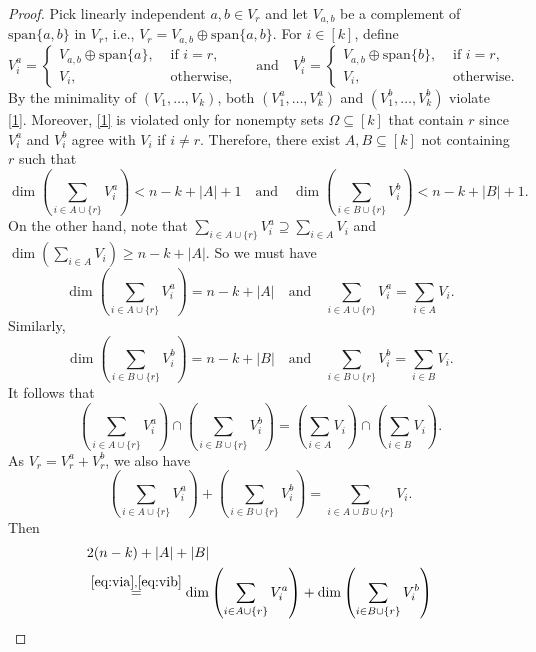 \documentclass[11pt]{article}
\theoremstyle{plain}
\theoremstyle{definition}
\theoremstyle{remark}
\begin{document}
\begin{proof}
Pick linearly independent $a,b\in V_r$ and let $V_{a,b}$ be a complement of $\mathrm{span}\{a,b\}$ in $V_r$, i.e., $V_r=V_{a,b}\oplus\mathrm{span}\{a,b\}$.
For $i\in [k]$, define
\[
V_i^a= \begin{cases} V_{a,b}\oplus \mathrm{span}\{a\}, & \text { if } i=r, \\ V_i, & \text { otherwise, }\end{cases}
\quad\text{and}\quad
V_i^b= \begin{cases}V_{a,b}\oplus \mathrm{span}\{b\}, & \text { if } i=r, \\ V_i, & \text { otherwise. }\end{cases}
\]
By the minimality of $(V_1,\dots,V_k)$, both $(V_1^a,\dots,V_k^a)$ and $(V_1^b,\dots,V_k^b)$ violate \eqref{1}. 
Moreover, \eqref{1} is violated only for nonempty sets $\Omega\subseteq [k]$ that contain $r$ since $V_i^a$ and $V_i^b$ agree with $V_i$ if $i\neq r$. 
Therefore, there exist $A, B\subseteq[k]$ not containing $r$ such that
\[
\dim\left(\sum_{i\in A\cup\{r\}} V_i^a \right)<n-k+|A|+1\quad\text{and}\quad\dim\left(\sum_{i\in B\cup\{r\}} V_i^b\right)<n-k+|B|+1.
\]
On the other hand, note that $\sum_{i\in A\cup\{r\}}V_i^a\supseteq \sum_{i\in A }V_i$ and $\dim(\sum_{i\in A }V_i)\geq n-k+|A|$.
So we must have 
\begin{equation}\label{eq:via}
\dim\left(\sum_{i\in A\cup\{r\}}V_i^a\right)=n-k+|A| \quad\text{and}\quad \sum_{i\in A\cup\{r\}}V_i^a=\sum_{i\in A}V_i.
\end{equation}
Similarly,
\begin{equation}\label{eq:vib}
\dim\left(\sum_{i\in B\cup\{r\}}V_i^b\right)=n-k+|B| \quad\text{and}\quad \sum_{i\in B\cup\{r\}}V_i^b=\sum_{i\in B}V_i.
\end{equation}
It follows that
\begin{equation}\label{ff1}
    \left(\sum_{i\in A\cup\{r\}}V_i^a\right)\cap\left(\sum_{i\in B\cup\{r\}}V_i^b\right)=\left(\sum_{i\in A }V_i\right) \cap \left(\sum_{i\in B }V_i\right).
\end{equation}
As $V_r=V_r^a+V_r^b$, we also have
\begin{equation}\label{ff2}\left(\sum_{i\in A\cup\{r\}}V_i^a\right) + \left(\sum_{i\in B\cup\{r\}}V_i^b\right)=\sum_{i\in A\cup B\cup \{r\} }V_i.
\end{equation}
Then
\begin{equation}\label{ff3}
\begin{aligned}
&2(n-k)+|A|+|B|\\
&\stackrel{\eqref{eq:via},\eqref{eq:vib}}{=}\dim\left(\sum_{i\in A\cup\{r\}}V_i^a\right)+\dim\left(\sum_{i\in B\cup\{r\}}V_i^b\right)\\

\end{aligned}
\end{equation}
\end{proof}
\end{document}
